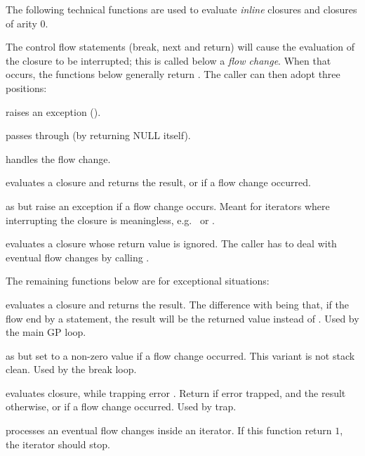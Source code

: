 The following technical functions are used to evaluate \emph{inline}
closures and closures of arity 0.

The control flow statements (break, next and return) will cause the
evaluation of the closure to be interrupted; this is called below a
\emph{flow change}. When that occurs, the functions below generally
 return . The caller can then adopt three positions:

\item raises an exception ().

\item passes through (by returning NULL itself).

\item handles the flow change.

 evaluates a closure and returns the result,
or  if a flow change occurred.

 as  but raise
an exception if a flow change occurs. Meant for iterators where
interrupting the closure is meaningless, e.g.~ or .

 evaluates a closure whose return
value is ignored. The caller has to deal with eventual flow changes by
calling .

The remaining functions below are for exceptional situations:

 evaluates a closure and returns the result.
The difference with  being that, if the flow end by a
 statement, the result will be the returned value instead of
. Used by the main GP loop.

 as 
but set  to a non-zero value if a flow change occurred. This
variant is not stack clean. Used by the break loop.

 evaluates closure, while
trapping error . Return  if error trapped, and the
result otherwise, or  if a flow change occurred. Used by trap.



 processes an eventual flow changes inside an iterator. If this function return $1$, the iterator should stop.

